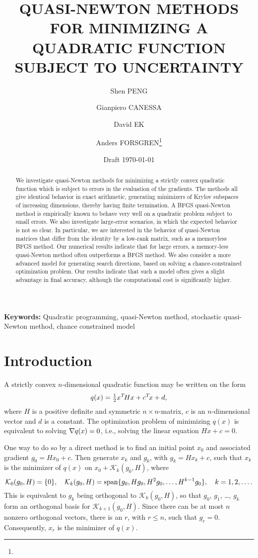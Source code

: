 \documentclass[11pt,twoside]{article}
\title{QUASI-NEWTON METHODS FOR MINIMIZING A QUADRATIC FUNCTION
  SUBJECT TO UNCERTAINTY}
\author{Shen PENG\footnotemark\addtocounter{footnote}{-1}
   \and Gianpiero CANESSA\footnotemark\addtocounter{footnote}{-1}
   \and David EK\footnotemark\addtocounter{footnote}{-1}
   \and Anders FORSGREN\thanks{\footAF}}
\date  {Draft \today}
\def\calK{{\mathcal K}}
\begin{document}
\maketitle\thispagestyle{plain}

\begin{abstract}
  We investigate quasi-Newton methods for minimizing a strictly convex
  quad\-ra\-tic function which is subject to errors in the evaluation
  of the gradients. The methods all give identical behavior in exact
  arithmetic, generating minimizers of Krylov subspaces of increasing
  dimensions, thereby having finite termination. A BFGS quasi-Newton
  method is empirically known to behave very well on a quadratic
  problem subject to small errors. We also investigate large-error
  scenarios, in which the expected behavior is not so clear. In
  particular, we are interested in the behavior of quasi-Newton
  matrices that differ from the identity by a low-rank matrix, such as
  a memoryless BFGS method. Our numerical results indicate that for
  large errors, a memory-less quasi-Newton method often outperforms a
  BFGS method. We also consider a more advanced model for generating
  search directions, based on solving a chance-constrained
  optimization problem. Our results indicate that such a model often
  gives a slight advantage in final accuracy, although the
  computational cost is significantly higher.
\end{abstract}

\textbf{Keywords:} Quadratic programming, quasi-Newton method, stochastic quasi-Newton method, chance constrained model  \newline

\section{Introduction}\label{sec-intro}

A strictly convex $n$-dimensional quadratic function may be written on
the form
\[
q(x) = {\textstyle{\frac12}} x^T\! H x + c^T\! x + d,
\]
where $H$ is a positive definite and symmetric $n\times n$-matrix,
$c$ is an $n$-dimensional vector and $d$ is a constant. The
optimization problem of minimizing $q(x)$ is equivalent to solving
$\nabla q(x)=0$, i.e., solving the linear equation $Hx+c=0$.

One way to do so by a direct method is to find an initial point $x_0$
and associated gradient $g_0=Hx_0+c$. Then generate $x_k$ and $g_k$,
with $g_k = H x_k +c$, such that $x_k$ is the minimizer of $q(x)$ on
$x_0 + \calK_k(g_0,H)$, where
\[
\calK_0(g_0,H)=\{0\}, \quad \calK_k(g_0,H)=\Span\{g_0,Hg_0,H^2 g_0,\dots,H^{k-1}
g_0\}, \quad k=1,2,\dots.
\]
This is equivalent to $g_k$ being orthogonal to $\calK_k(g_0,H)$, so
that $g_0$, $g_1$, \dots, $g_k$ form an orthogonal basis for
$\calK_{k+1}(g_0,H)$. Since there can be at most $n$ nonzero
orthogonal vectors, there is an $r$, with $r\le n$, such that
$g_r=0$. Consequently, $x_r$ is the minimizer of $q(x)$.
\end{document}
